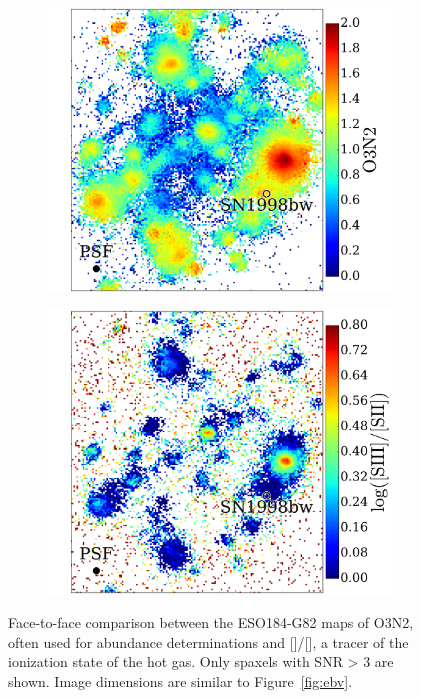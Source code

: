 \documentclass[traditabstract]{aa}
\newcommand{\sii}{[\ion{S}{ii}]}
\newcommand{\siii}{[\ion{S}{iii}]}
\begin{document}
\begin{figure}
\begin{subfigure}{.24\textwidth}
  \includegraphics[width=0.999\linewidth]{Figs/MUSE_SN1998bw_O3N2.pdf}
\end{subfigure}
\begin{subfigure}{.249\textwidth}
  \includegraphics[width=0.999\linewidth]{Figs/MUSE_SN1998bw_S3S2.pdf}
\end{subfigure}
\caption{Face-to-face comparison between the ESO184-G82 maps of O3N2, often used for abundance determinations and \siii/\sii, a tracer of the ionization state of the hot gas. Only spaxels with SNR > 3 are shown. Image dimensions are similar to Figure~\ref{fig:ebv}.}
\label{fig:s3s2}
\end{figure}
\end{document}
